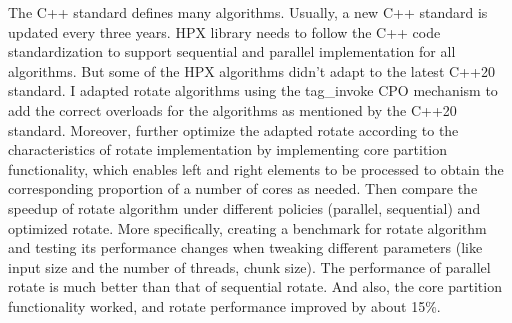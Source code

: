 The C++ standard defines many algorithms. Usually, a new C++ standard is updated every three years. HPX library needs to follow the C++ code standardization to support sequential and parallel implementation for all algorithms. But some of the HPX algorithms didn’t adapt to the latest C++20 standard. I adapted rotate algorithms using the tag\_invoke CPO mechanism to add the correct overloads for the algorithms as mentioned by the C++20 standard. Moreover, further optimize the adapted rotate according to the characteristics of rotate implementation by implementing core partition functionality, which enables left and right elements to be processed to obtain the corresponding proportion of a number of cores as needed.
Then compare the speedup of rotate algorithm under different policies (parallel, sequential) and optimized rotate. More specifically, creating a benchmark for rotate algorithm and testing its performance changes when tweaking different parameters (like input size and the number of threads, chunk size).
The performance of parallel rotate is much better than that of sequential rotate. And also, the core partition functionality worked, and rotate performance improved by about 15\%. 